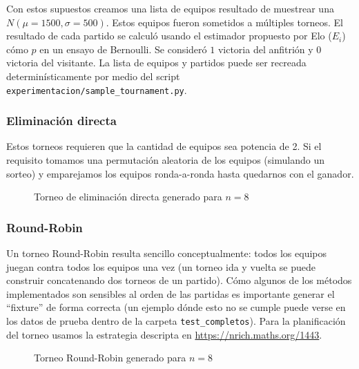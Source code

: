 \documentclass[a4paper]{article}
\begin{document}
Con estos supuestos creamos una lista de equipos resultado de muestrear una $N(\mu=1500, \sigma=500)$. Estos equipos fueron sometidos a múltiples torneos. El resultado de cada partido se calculó usando el estimador propuesto por Elo ($E_i$) cómo $p$ en un ensayo de Bernoulli. Se consideró $1$ victoria del anfitrión y $0$ victoria del visitante. La lista de equipos y partidos puede ser recreada determinísticamente por medio del script \texttt{experimentacion/sample\_tournament.py}.

\subsubsection{Eliminación directa}

Estos torneos requieren que la cantidad de equipos sea potencia de 2. Si el requisito tomamos una permutación aleatoria de los equipos (simulando un sorteo) y  emparejamos los equipos ronda-a-ronda hasta quedarnos con el ganador.

\begin{figure}[H]
    \begin{center}
    \end{center}
    \caption{Torneo de eliminación directa generado para $n=8$}
    \label{fig:knockoff-tournament}
\end{figure}

\subsubsection{Round-Robin}

Un torneo Round-Robin resulta sencillo conceptualmente: todos los equipos juegan contra todos los equipos una vez (un torneo ida y vuelta se puede construir concatenando dos torneos de un partido). Cómo algunos de los métodos implementados son sensibles al orden de las partidas es importante generar el ``fixture'' de forma correcta (un ejemplo dónde esto no se cumple puede verse en los datos de prueba dentro de la carpeta \texttt{test\_completos}). Para la planificación del torneo usamos la estrategia descripta en \url{https://nrich.maths.org/1443}.
\begin{figure}[H]
    \begin{center}
    \end{center}
    \caption{Torneo Round-Robin generado para $n=8$}
    \label{fig:round-robin-tournament}
\end{figure}
\end{document}
